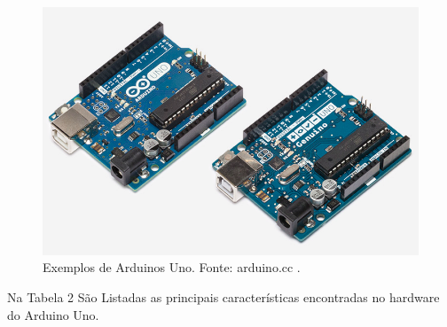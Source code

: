 \FloatBarrier
\begin{figure}[!htbp]
	\centering
	\includegraphics[scale=0.7]{imagens/Uno}
	\caption{Exemplos de Arduinos Uno. Fonte: arduino.cc . }
	
	\label{fig:ArduinoUno}
\end{figure}
\FloatBarrier

Na Tabela 2 São Listadas as principais características encontradas no hardware do Arduino Uno.

